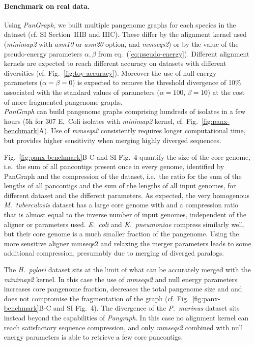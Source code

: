 \documentclass[aps,rmp,reprint,superscriptaddress,notitlepage,10pt]{revtex4-1}
\begin{document}
\paragraph*{Benchmark on real data.}
Using \textit{PanGraph}, we built multiple pangenome graphs for each species in the dataset (cf. SI Section~IIIB and IIIC). These differ by the alignment kernel used (\textit{minimap2} with \textit{asm10} or \textit{asm20} option, and \textit{mmseqs2}) or by the value of the pseudo-energy parameters $\alpha,\beta$ from eq.~(\ref{eq:pseudo-energy}).
Different alignment kernels are expected to reach different accuracy on datasets with different diversities (cf. Fig.~\ref{fig:toy-accuracy}). Moreover the use of null energy parameters ($\alpha = \beta = 0$) is expected to remove the threshold divergence of 10\% associated with the standard values of parameters ($\alpha=100$, $\beta=10$) at the cost of more fragmented pangenome graphs.\\
\textit{PanGraph} can build pangenome graphs comprising hundreds of isolates in a few hours (5h for 307 E.~Coli isolates with \textit{minimap2} kernel, cf. Fig.~\ref{fig:panx-benchmark}A).
Use of \textit{mmseqs2} consistently requires longer computational time, but provides higher sensitivity when merging highly diverged sequences.

Fig.~\ref{fig:panx-benchmark}B-C and SI Fig.~4 quantify the size of the core genome, i.e.~the sum of all pancontigs present once in every genome, identified by PanGraph and the compression of the dataset, i.e.~the ratio for the sum of the lengths of all pancontigs and the sum of the lengths of all input genomes, for different dataset and the different parameters.
As expected, the very homogenous \textit{M.~tuberculosis} dataset has a large core genome with and a compression ratio that is almost equal to the inverse number of input genomes, independent of the aligner or parameters used.
\textit{E.~coli} and \textit{K.~pneumoniae} compress similarly well, but their core genome is a much smaller fraction of the pangenome.
Using the more sensitive aligner mmseqs2 and relaxing the merger parameters leads to some additional compression, presumably due to merging of diverged paralogs.

The \textit{H.~pylori}  dataset sits at the limit of what can be accurately merged with the \textit{minimap2} kernel.
In this case the use of \textit{mmseqs2} and null energy parameters increases core pangenome fraction, decreases the total pangenome size and and does not compromise the fragmentation of the graph (cf. Fig.~\ref{fig:panx-benchmark}B-C and SI Fig.~4).
The divergence of the \textit{P.~marinus} dataset sits instead beyond the capabilities of \textit{Pangraph}. In this case no alignment kernel can reach satisfactory sequence compression, and only \textit{mmseqs2} combined with null energy parameters is able to retrieve a few core pancontigs.\\
\end{document}
